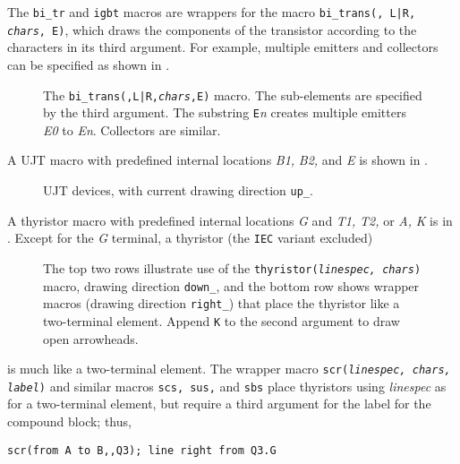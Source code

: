The {\tt bi\_tr} and {\tt igbt} macros are wrappers for
the macro {\tt bi\_trans(\linespec, L|R, {\sl chars}, E)}, which
draws the components of the transistor according to the characters in its
third argument.  For example, multiple emitters and collectors can be
specified as shown in .
\begin{figure}[h!t]
   
   \caption{The {\tt bi\_trans(\linespec,L|R,{\sl chars},E)} macro.
   The sub-elements are specified by the third argument.  The substring
   {\tt E}{\sl n} creates multiple emitters {\sl E0} to {\sl En}.
   Collectors are similar.}
   \label{bitrans}
   \end{figure}

A UJT macro with predefined internal locations {\sl B1,} {\sl B2,}
and {\sl E} is shown in .
\begin{figure}[h!t]
   
   \caption{UJT devices, with current drawing direction {\tt up\_}. }
   \label{ujt}
   \end{figure}

A thyristor macro with predefined internal locations
 {\sl G} and {\sl T1,} {\sl T2,} or
 {\sl A,} {\sl K} is in .
Except for the {\sl G} terminal, a thyristor (the {\tt IEC} variant excluded)
\begin{figure}[h!b]
   
   \vspace*{-1ex}
   \caption{The top two rows illustrate use of the
    {\tt thyristor({\sl linespec, chars})} macro,
    drawing direction {\tt down\_}, and the bottom row shows wrapper
    macros (drawing direction {\tt right\_}) that place
    the thyristor like a two-terminal element. Append {\tt K}
    to the second argument to draw open arrowheads.}
   \label{thyristor}
   \end{figure}
is much like a two-terminal element.  The wrapper macro
{\tt scr({\sl linespec, chars, label})} and similar macros
{\tt scs, sus,} and {\tt sbs} place thyristors
using {\sl linespec} as for a two-terminal element,
but require a third argument for the label for the compound block; thus,

{\tt scr(from A to B,{,}Q3); line right from Q3.G}


